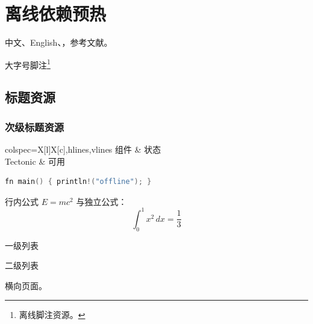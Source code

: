 \documentclass[fontset=fandol]{ctexbook}
\begin{document}
\tableofcontents
\chapter{离线依赖预热}

中文、English、，参考文献\cite{warmup2026}。

{\fontsize{14.05249pt}{24pt}\selectfont 大字号脚注\footnote{离线脚注资源。}}

\section{标题资源}
\subsection{次级标题资源}

\begin{longtblr}{colspec={X[l]X[c]},hlines,vlines}
组件 & 状态 \\
Tectonic & 可用
\end{longtblr}


\begin{lstlisting}[language=C]
fn main() { println!("offline"); }
\end{lstlisting}

行内公式 $E=mc^2$ 与独立公式：
\[
  \int_0^1 x^2\,dx = \frac{1}{3}
\]

\begin{asparaenum}
  \item 一级列表
  \begin{inparaenum}
    \item 二级列表
  \end{inparaenum}
\end{asparaenum}

\begin{landscape}
横向页面。
\end{landscape}


\end{document}

